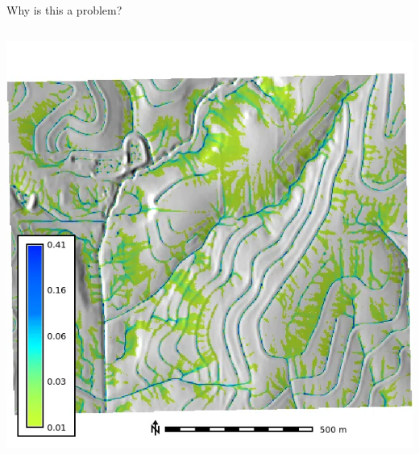 \documentclass[
  ignorenonframetext,
]{beamer}
\begin{document}
\begin{frame}
\begin{block}{Why is this a problem?}
\begin{columns}[T]
\begin{column}{0.5\textwidth}
\includegraphics{../notebooks/output/clay-center_depth_1_1_s_prob.webp}
\end{column}
\end{columns}
\end{block}
\end{frame}
\end{document}
